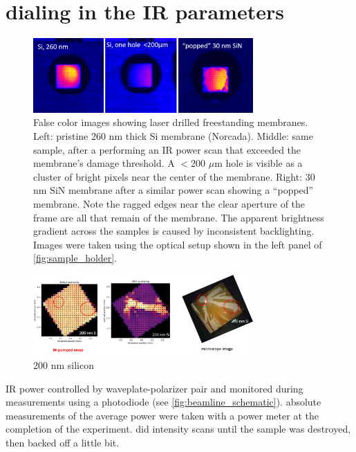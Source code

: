 \section{dialing in the IR parameters}

\begin{figure}
	\centering
	\includegraphics[width=0.75\textwidth]{figures/chap3/sample_damage.png}
	\caption{False color images showing laser drilled freestanding membranes. Left: pristine 260 nm thick Si membrane (Norcada). Middle: same sample, after a performing an IR power scan that exceeded the membrane's damage threshold. A $<$200 $\mu$m hole is visible as a cluster of bright pixels near the center of the membrane. Right: 30 nm SiN membrane after a similar power scan showing a ``popped'' membrane. Note the ragged edges near the clear aperture of the frame are all that remain of the membrane. The apparent brightness gradient across the samples is caused by inconsistent backlighting. Images were taken using the optical setup shown in the left panel of \cref{fig:sample_holder}.}
	\label{fig:sample_damage}
\end{figure}

\begin{figure}
	\centering
	\includegraphics[width=0.75\textwidth]{figures/chap3/Si_damage.png}
	\caption{200 nm silicon}
	\label{fig:Si_damage}
\end{figure}

IR power controlled by waveplate-polarizer pair and monitored during measurements using a photodiode (see \cref{fig:beamline_schematic}). absolute measurements of the average power were taken with a power meter at the completion of the experiment. did intensity scans until the sample was destroyed, then backed off a little bit.


